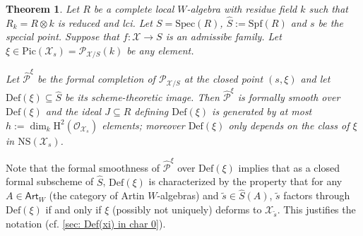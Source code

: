 \documentclass[letter, 11pt]{article}
\theoremstyle{plain}
\newtheorem{theorem}[subsubsection]{Theorem}
\theoremstyle{definition}
\newcommand{\Spec}{\mathrm{Spec}}
\newcommand\tensor{{\otimes}}
\newcommand{\<}{\langle}
\renewcommand{\>}{\rangle}
\def\wt{\widetilde}
\newcommand{\sX}{\mathcal{X}}
\newcommand{\sO}{\mathcal{O}}
\newcommand{\Pic}{\mathrm{Pic}}
\renewcommand{\H}{\mathrm{H}}
\newcommand{\Spf}{\mathrm{Spf}}
\newcommand{\shP}{\mathscr{P}}
\newcommand{\Def}{\mathrm{Def}}
\newcommand{\NS}{\mathrm{NS}}
\begin{document}
\begin{theorem}
\label{thm: Deligne generalized}
Let $R$ be a complete local $W$-algebra with residue field $k$ such that $R_k = R \tensor k$ is reduced and lci. Let $S = \Spec(R)$, $\hat{S} := \Spf(R)$ and $s$ be the special point. Suppose that $f : \sX \to S$ is an admissibe family. Let $\xi \in \Pic(\sX_s) = \shP_{\sX/S}(k)$ be any element. 

Let $\hat{\shP}^\xi$ be the formal completion of $\shP_{\sX/S}$ at the closed point $(s, \xi)$ and let $\Def(\xi) \subseteq \hat{S}$ be its scheme-theoretic image. Then $\hat{\shP}^\xi$ is formally smooth over $\Def(\xi)$ and the ideal $J \subseteq R$ defining $\Def(\xi)$ is generated by at most $h := \dim_k \H^2(\sO_{\sX_s})$ elements; moreover $\Def(\xi)$ only depends on the class of $\xi$ in $\NS(\sX_s)$. 
\end{theorem}

Note that the formal smoothness of $\hat{\shP}^\xi$ over $\Def(\xi)$ implies that as a closed formal subscheme of $\hat{S}$, $\Def(\xi)$ is characterized by the property that for any $A \in \mathsf{Art}_W$ (the category of Artin $W$-algebras) and $\wt{s} \in \hat{S}(A)$, $\wt{s}$ factors through $\Def(\xi)$ if and only if $\xi$ (possibly not uniquely) deforms to $\sX_{\wt{s}}$. This justifies the notation (cf. \ref{sec: Def(xi) in char 0}). 
\end{document}
